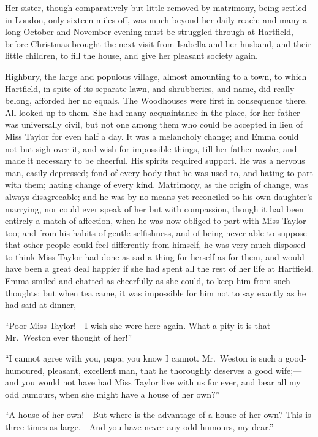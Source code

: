 Her sister, though comparatively but little removed by matrimony,
being settled in London, only sixteen miles off, was much beyond
her daily reach; and many a long October and November evening must
be struggled through at Hartfield, before Christmas brought the next
visit from Isabella and her husband, and their little children,
to fill the house, and give her pleasant society again.

Highbury, the large and populous village, almost amounting to a town,
to which Hartfield, in spite of its separate lawn, and shrubberies,
and name, did really belong, afforded her no equals.  The Woodhouses
were first in consequence there.  All looked up to them.  She had
many acquaintance in the place, for her father was universally civil,
but not one among them who could be accepted in lieu of Miss
Taylor for even half a day.  It was a melancholy change; and Emma
could not but sigh over it, and wish for impossible things,
till her father awoke, and made it necessary to be cheerful.
His spirits required support.  He was a nervous man, easily depressed;
fond of every body that he was used to, and hating to part with them;
hating change of every kind.  Matrimony, as the origin of change,
was always disagreeable; and he was by no means yet reconciled
to his own daughter's marrying, nor could ever speak of her but
with compassion, though it had been entirely a match of affection,
when he was now obliged to part with Miss Taylor too; and from
his habits of gentle selfishness, and of being never able to
suppose that other people could feel differently from himself,
he was very much disposed to think Miss Taylor had done as sad
a thing for herself as for them, and would have been a great deal
happier if she had spent all the rest of her life at Hartfield.
Emma smiled and chatted as cheerfully as she could, to keep him
from such thoughts; but when tea came, it was impossible for him
not to say exactly as he had said at dinner,

``Poor Miss Taylor!---I wish she were here again.  What a pity it
is that Mr.\ Weston ever thought of her!''

``I cannot agree with you, papa; you know I cannot.  Mr.\ Weston is such
a good-humoured, pleasant, excellent man, that he thoroughly deserves
a good wife;---and you would not have had Miss Taylor live with us
for ever, and bear all my odd humours, when she might have a house of her own?''

``A house of her own!---But where is the advantage of a house of her own?
This is three times as large.---And you have never any odd humours,
my dear.''

